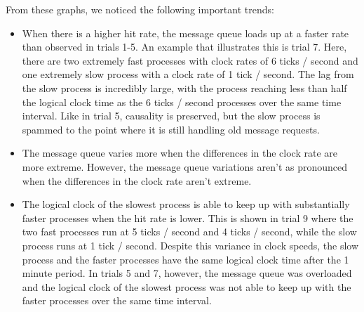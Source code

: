 \documentclass[
	a4paper, %
	10pt, %
	unnumberedsections, %
	twoside, %
]{LTJournalArticle}
\begin{document}
From these graphs, we noticed the following important trends: 
\begin{itemize}
    \item When there is a higher hit rate, the message queue loads up at a faster rate than observed in trials 1-5. An example that illustrates this is trial 7. Here, there are two extremely fast processes with clock rates of 6 ticks / second and one extremely slow process with a clock rate of 1 tick / second. The lag from the slow process is incredibly large, with the process reaching less than half the logical clock time as the 6 ticks / second processes over the same time interval. Like in trial 5, causality is preserved, but the slow process is spammed to the point where it is still handling old message requests.
    \item The message queue varies more when the differences in the clock rate are more extreme. However, the message queue variations aren't as pronounced when the differences in the clock rate aren't extreme. 
    \item The logical clock of the slowest process is able to keep up with substantially faster processes when the hit rate is lower. This is shown in trial 9 where the two fast processes run at 5 ticks / second and 4 ticks / second, while the slow process runs at 1 tick / second. Despite this variance in clock speeds, the slow process and the faster processes have the same logical clock time after the 1 minute period. In trials 5 and 7, however, the message queue was overloaded and the logical clock of the slowest process was not able to keep up with the faster processes over the same time interval. 
    
\end{itemize}
\end{document}
